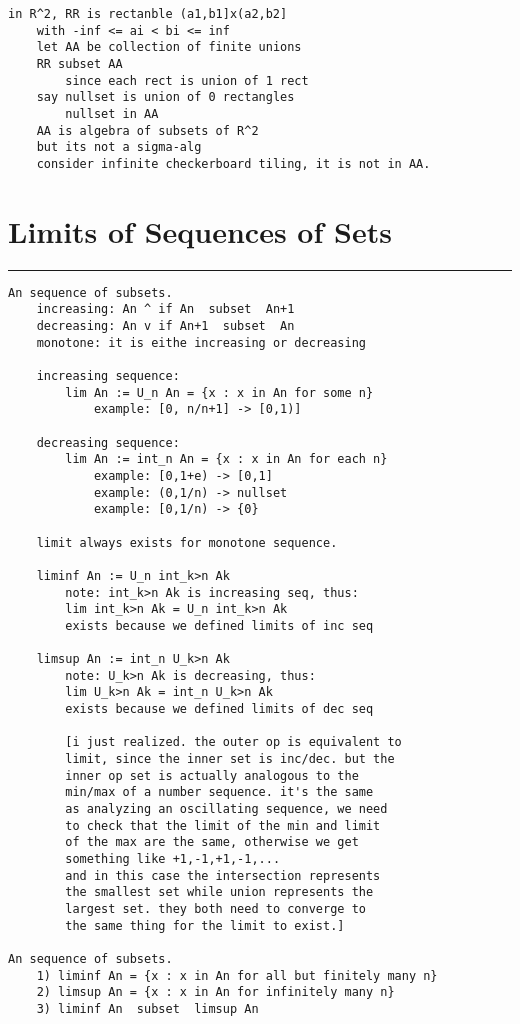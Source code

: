 \documentclass{article}
\begin{document}
\begin{flushleft}
\begin{verbatim}
in R^2, RR is rectanble (a1,b1]x(a2,b2]
    with -inf <= ai < bi <= inf 
    let AA be collection of finite unions 
    RR subset AA 
        since each rect is union of 1 rect 
    say nullset is union of 0 rectangles
        nullset in AA 
    AA is algebra of subsets of R^2
    but its not a sigma-alg 
    consider infinite checkerboard tiling, it is not in AA. 
\end{verbatim}

\section*{Limits of Sequences of Sets}
\bigbreak
\hrule
\bigbreak

\begin{verbatim}
An sequence of subsets. 
    increasing: An ^ if An  subset  An+1 
    decreasing: An v if An+1  subset  An 
    monotone: it is eithe increasing or decreasing 
    
    increasing sequence: 
        lim An := U_n An = {x : x in An for some n}
            example: [0, n/n+1] -> [0,1)]
    
    decreasing sequence: 
        lim An := int_n An = {x : x in An for each n}
            example: [0,1+e) -> [0,1]
            example: (0,1/n) -> nullset 
            example: [0,1/n) -> {0}
        
    limit always exists for monotone sequence. 
    
    liminf An := U_n int_k>n Ak
        note: int_k>n Ak is increasing seq, thus:
        lim int_k>n Ak = U_n int_k>n Ak
        exists because we defined limits of inc seq
            
    limsup An := int_n U_k>n Ak
        note: U_k>n Ak is decreasing, thus:
        lim U_k>n Ak = int_n U_k>n Ak
        exists because we defined limits of dec seq
    
        [i just realized. the outer op is equivalent to
        limit, since the inner set is inc/dec. but the 
        inner op set is actually analogous to the 
        min/max of a number sequence. it's the same 
        as analyzing an oscillating sequence, we need 
        to check that the limit of the min and limit 
        of the max are the same, otherwise we get 
        something like +1,-1,+1,-1,...
        and in this case the intersection represents
        the smallest set while union represents the 
        largest set. they both need to converge to 
        the same thing for the limit to exist.]

An sequence of subsets.
    1) liminf An = {x : x in An for all but finitely many n}
    2) limsup An = {x : x in An for infinitely many n}
    3) liminf An  subset  limsup An 


\end{verbatim}
\end{flushleft}
\end{document}
